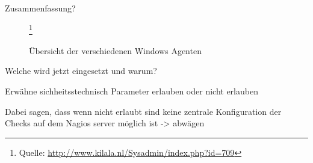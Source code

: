 Zusammenfassung?

\begin{figure}[ht]
	\centering
		\caption{Übersicht der verschiedenen Windows Agenten}\footnote{Quelle: \url{http://www.kilala.nl/Sysadmin/index.php?id=709}}
		\label{win-agents}
\end{figure}

Welche wird jetzt eingesetzt und warum?

Erwähne sichheitsstechnisch Parameter erlauben oder nicht erlauben

Dabei sagen, dass wenn nicht erlaubt sind keine zentrale Konfiguration der Checks auf dem Nagios server möglich ist -> abwägen














